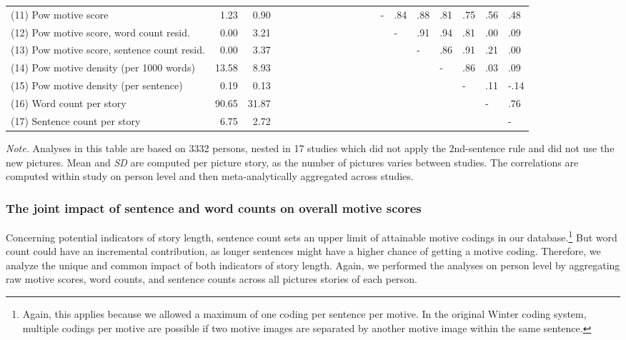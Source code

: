 \documentclass[man,a4paper,mask]{apa6}
\begin{document}
{\begin{sidewaystable*}
\begin{threeparttable}
\begin{tabularx}{\textwidth}{Xrrlllllllllllllllll}
  (11) Pow motive score & 1.23 & 0.90 &  &  &  &  &  &  &  &  &  &  & - & .84 & .88 & .81 & .75 & .56 & .48 \\ 
  (12) Pow motive score, word count resid. & 0.00 & 3.21 &  &  &  &  &  &  &  &  &  &  &  & - & .91 & .94 & .81 & .00 & .09 \\ 
  (13) Pow motive score, sentence count resid. & 0.00 & 3.37 &  &  &  &  &  &  &  &  &  &  &  &  & - & .86 & .91 & .21 & .00 \\ 
  (14) Pow motive density (per 1000 words) & 13.58 & 8.93 &  &  &  &  &  &  &  &  &  &  &  &  &  & - & .86 & .03 & .09 \\ 
  (15) Pow motive density (per sentence) & 0.19 & 0.13 &  &  &  &  &  &  &  &  &  &  &  &  &  &  & - & .11 & -.14 \\ 
  (16) Word count per story & 90.65 & 31.87 &  &  &  &  &  &  &  &  &  &  &  &  &  &  &  & - & .76 \\ 
  (17) Sentence count per story & 6.75 & 2.72 &  &  &  &  &  &  &  &  &  &  &  &  &  &  &  &  & - \\ 
   \hline

		\bottomrule
		\end{tabularx}
		\begin{tablenotes}[para,flushleft]
			{\small
			\vspace*{0.75em}
			\textit{Note.} Analyses in this table are based on 3332 persons, nested in 17 studies which did not apply the 2nd-sentence rule and did not use the new pictures. Mean and \emph{SD} are computed per picture story, as the number of pictures varies between studies. The correlations are computed within study on person level and then meta-analytically aggregated across studies.}
	      \end{tablenotes}
	  \end{threeparttable}
\end{sidewaystable*}


\subsubsection{The joint impact of sentence and word counts on overall motive scores}
Concerning potential indicators of story length, sentence count sets an upper limit of attainable motive codings in our database.\footnote{Again, this applies because we allowed a maximum of one coding per sentence per motive. In the original Winter coding system, multiple codings per motive are possible if two motive images are separated by another motive image within the same sentence.} But word count could have an incremental contribution, as longer sentences might have a higher chance of getting a motive coding. Therefore, we analyze the unique and common impact of both indicators of story length. Again, we performed the analyses on person level by aggregating raw motive scores, word counts, and sentence counts across all pictures stories of each person.

}
\end{document}
